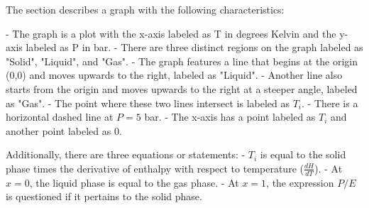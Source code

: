 The section describes a graph with the following characteristics:

- The graph is a plot with the x-axis labeled as T in degrees Kelvin and the y-axis labeled as P in bar.
- There are three distinct regions on the graph labeled as "Solid", "Liquid", and "Gas".
- The graph features a line that begins at the origin (0,0) and moves upwards to the right, labeled as "Liquid".
- Another line also starts from the origin and moves upwards to the right at a steeper angle, labeled as "Gas".
- The point where these two lines intersect is labeled as \( T_i \).
- There is a horizontal dashed line at \( P = 5 \) bar.
- The x-axis has a point labeled as \( T_i \) and another point labeled as 0.

Additionally, there are three equations or statements:
- \( T_i \) is equal to the solid phase times the derivative of enthalpy with respect to temperature (\( \frac{dH}{dT} \)).
- At \( x = 0 \), the liquid phase is equal to the gas phase.
- At \( x = 1 \), the expression \( P/E \) is questioned if it pertains to the solid phase.